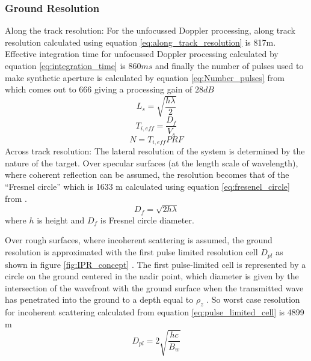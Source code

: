 \subsubsection{Ground Resolution}
Along the track resolution:
For the unfocussed Doppler processing, along track resolution calculated using equation \ref{eq:along_track_resolution} is 817m. Effective integration time for unfocussed Doppler processing calculated by equation \ref{eq:integration_time} is $860 ms$ and finally the number of pulses used to make synthetic aperture is calculated by equation \ref{eq:Number_pulses} from \cite{Gany_SRS}  which comes out to 666 giving a processing gain of $28 dB$ 
%
\begin{equation}
L_{s} = \sqrt{\dfrac{h\lambda}{2}}
\label{eq:along_track_resolution}
\end{equation}
%
\begin{equation}
T_{i,eff} = \dfrac{D_{f}}{V_{s}}
\label{eq:integration_time}
\end{equation}
\begin{equation}
N = T_{i,eff}PRF 
\label{eq:Number_pulses}
\end{equation}
Across track resolution: The lateral resolution of the system is determined by the nature of the target.
Over specular surfaces (at the length scale of wavelength), where coherent reflection can be assumed, the resolution becomes that of the ``Fresnel circle'' which is 1633 m calculated using equation \ref{eq:fresenel_circle} from \cite{SHARAD}.
\begin{equation}
D_{f} = \sqrt{2h\lambda}
\label{eq:fresenel_circle}
\end{equation}
where $h$ is height and $D_{f}$ is Fresnel circle diameter.

Over rough surfaces, where incoherent scattering is assumed, the ground resolution is approximated with the first pulse limited resolution cell $D_{pl}$ as shown in figure \ref{fig:IPR_concept} . The first pulse-limited cell is represented by a circle on the ground centered in the nadir point, which diameter is given by the intersection of the wavefront with the ground surface when the transmitted wave has penetrated into the ground to a depth equal to $\rho_{z}$ \cite{Gany_SRS}. So worst case resolution for incoherent scattering calculated from equation \ref{eq:pulse_limited_cell} is 4899 m 
\begin{equation}
D_{pl} = 2\sqrt{\dfrac{hc}{B_{w}}}
\label{eq:pulse_limited_cell}
\end{equation}